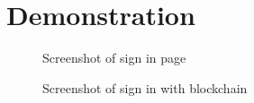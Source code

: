 \chapter{Demonstration} 
\label{chapter:introduction}

\begin{figure}[htb]
    \centering
    \caption{{\footnotesize Screenshot of sign in page}}
    \label{fig:signin}
\end{figure}

\begin{figure}[htb]
    \centering
    \caption{{\footnotesize Screenshot of sign in with blockchain}}
    \label{fig:signinblockchain}
\end{figure}

